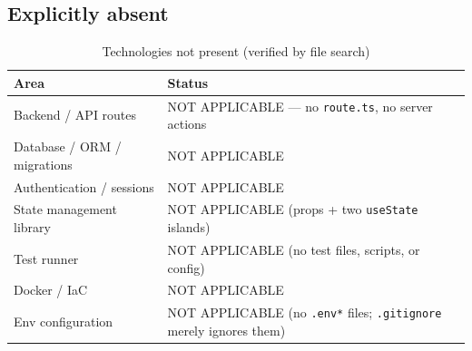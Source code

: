 \subsection{Explicitly absent}
\begin{table}[H]
\centering
\caption{Technologies not present (verified by file search)}
\begin{tabular}{|l|l|}
\hline
\textbf{Area} & \textbf{Status} \\ \hline
Backend / API routes & NOT APPLICABLE --- no \texttt{route.ts}, no server actions \\ \hline
Database / ORM / migrations & NOT APPLICABLE \\ \hline
Authentication / sessions & NOT APPLICABLE \\ \hline
State management library & NOT APPLICABLE (props + two \texttt{useState} islands) \\ \hline
Test runner & NOT APPLICABLE (no test files, scripts, or config) \\ \hline
Docker / IaC & NOT APPLICABLE \\ \hline
Env configuration & NOT APPLICABLE (no \texttt{.env*} files; \texttt{.gitignore} merely ignores them) \\ \hline
\end{tabular}
\end{table}
